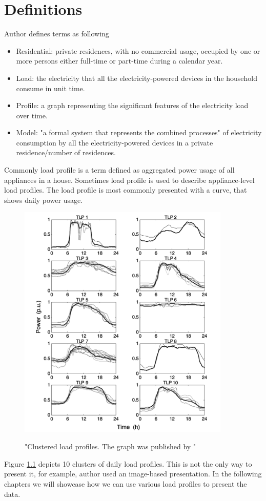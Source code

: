 \label{chapter2}
\chapter{Definitions}

Author \cite{Review2021} defines terms as following

\begin{itemize}
	\item Residential: private residences, with no commercial usage, occupied by one or more persons either full-time or part-time during a calendar year.
	\item Load: the electricity that all the electricity-powered devices in the household consume in unit time.
	\item Profile: a graph representing the significant features of the electricity load over time.
	\item Model: "a formal system that represents the combined processes" \cite{KAVOUSIAN2013184} of electricity consumption by all the electricity-powered devices in a private residence/number of residences.
\end{itemize}

Commonly load profile is a term defined as aggregated power usage of all appliances in a house. 
Sometimes load profile is used to describe appliance-level load profiles. 
The load profile is most commonly presented with a curve, that shows daily power usage.

\begin{figure}[H]
	\centering
	\caption{"Clustered load profiles. The graph was published by \protect\cite{GERBEC2005}"}
	\includegraphics[width=0.9\textwidth]{Figures/clustered_profiles.png}
	\label{fig:profiles}
\end{figure}

Figure \ref{fig:profiles} depicts 10 clusters of daily load profiles. 
This is not the only way to present it, for example, author \cite{Park2019} used an image-based presentation.
In the following chapters we will showcase how we can use various load profiles to present the data. 